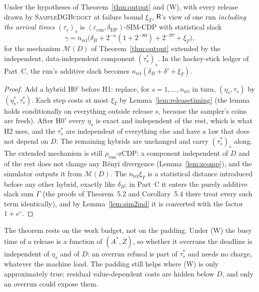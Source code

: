 \begin{corollary}\label{cor:timing}
Under the hypotheses of Theorem~\ref{thm:output} and (W), with every release drawn by \textsc{SampleDGBudget} at failure bound $\xi_T$, $\mathsf{R}$'s view of one run \emph{including the arrival times} $(\tau_s)_s$ is $(\varepsilon_{\mathrm{run}},\delta_{\mathrm{DP}})$-SIM-CDP with statistical slack
\[
  \gamma=n_{\mathrm{rel}}\bigl(\delta_B+2^{-\kappa}(1+2^{-80})+2^{-97}+\xi_T\bigr),
\]
for the mechanism $\mathcal M(D)$ of Theorem~\ref{thm:output} extended by the independent, data-independent component $(\tau^*_s)_s$. In the hockey-stick ledger of Part~C, the run's additive slack becomes $n_{\mathrm{rel}}(\delta_B+\delta'+\xi_T)$.
\end{corollary}
\begin{proof}
Add a hybrid H0$'$ before H1: replace, for $s=1,\dots,n_{\mathrm{rel}}$ in turn, $(\eta_s,\tau_s)$ by $(\eta^*_s,\tau^*_s)$. Each step costs at most $\xi_T$ by Lemma~\ref{lem:releasetiming} (the lemma holds conditionally on everything outside release $s$, because the sampler's coins are fresh). After H0$'$ every $\eta_s$ is exact and independent of the rest, which is what H2 uses, and the $\tau^*_s$ are independent of everything else and have a law that does not depend on $D$. The remaining hybrids are unchanged and carry $(\tau^*_s)_s$ along. The extended mechanism is still $\rho_{\mathrm{run}}$-zCDP: a component independent of $D$ and of the rest does not change any R\'enyi divergence (Lemma~\ref{lem:zcomp}), and the simulator outputs it from $\mathcal M(D)$. The $n_{\mathrm{rel}}\xi_T$ is a statistical distance introduced before any other hybrid, exactly like $\delta_B$; in Part~C it enters the purely additive slack sum $\Gamma$ (the proofs of Theorem~5.2 and Corollary~5.4 there treat every such term identically), and by Lemma~\ref{lem:sim2ind} it is converted with the factor $1+e^{\varepsilon}$.
\end{proof}

\begin{remark}
The theorem rests on the work budget, not on the padding. Under (W) the busy time of a release is a function of $(A^*,Z)$, so whether it overruns the deadline is independent of $\eta_s$ and of $D$: an overrun refusal is part of $\tau^*_s$ and needs no charge, whatever the machine load. The padding still helps where (W) is only approximately true: residual value-dependent costs are hidden below $D$, and only an overrun could expose them.
\end{remark}

